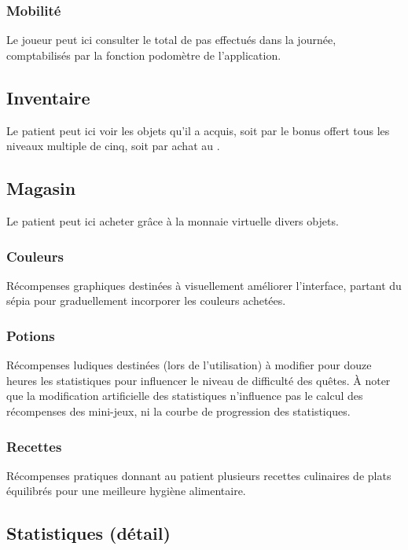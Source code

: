 \documentclass[a4paper,12pt,francais]{article}
\begin{document}
\subsubsection{Mobilité}
Le joueur peut ici consulter le total de pas effectués dans la journée, comptabilisés par la fonction podomètre de l'application.

\subsection{Inventaire}
Le patient peut ici voir les objets qu’il a acquis, soit par le bonus offert tous les niveaux multiple de cinq, soit par achat au .

\subsection{Magasin}\label{subsec:magasin}
Le patient peut ici acheter grâce à la monnaie virtuelle divers objets.

\subsubsection{Couleurs}
Récompenses graphiques destinées à visuellement améliorer l'interface, partant du sépia pour graduellement incorporer les couleurs achetées.

\subsubsection{Potions}\label{subsubsec:potions}
Récompenses ludiques destinées (lors de l'utilisation) à modifier pour douze heures les statistiques pour influencer le niveau de difficulté des quêtes. À noter que la modification artificielle des statistiques n'influence pas le calcul des récompenses des mini-jeux, ni la courbe de progression des statistiques.

\subsubsection{Recettes}
Récompenses pratiques donnant au patient plusieurs recettes culinaires de plats équilibrés pour une meilleure hygiène alimentaire. %

\subsection{Statistiques (détail)}\label{subsec:stats-detail}
\end{document}
